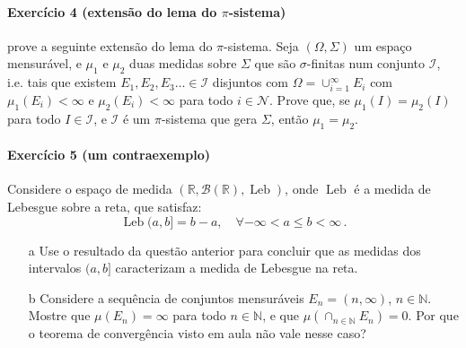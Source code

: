 \documentclass[10pt,a4paper]{article}
\begin{document}
		\paragraph{Exercício 4 (extensão do lema do $\pi$-sistema)} prove a seguinte extensão do lema do $\pi$-sistema. Seja $(\Omega, \Sigma)$ um espaço mensurável, e $\mu_1$ e $\mu_2$ duas medidas sobre $\Sigma$ que são $\sigma$-finitas num conjunto $\mathcal{I}$, i.e. tais que existem $E_1, E_2 , E_3 \ldots \in \mathcal{I}$ disjuntos com  $\Omega = \cup_{i=1}^\infty E_i$ com $\mu_1(E_i)<\infty$ e $\mu_2(E_i)<\infty$ para todo $i \in \mathcal{N}$. Prove que, se $\mu_1(I)  = \mu_2(I)$ para todo $I \in \mathcal{I}$, e $\mathcal{I}$ é um $\pi$-sistema que gera $\Sigma$, então $\mu_1 =  \mu_2$.
		
		\paragraph{Exercício 5 (um contraexemplo)} Considere o espaço de medida $(\mathbb{R}, \mathcal{B}(\mathbb{R}), \operatorname{Leb})$, onde  $\operatorname{Leb}$ é a medida de Lebesgue sobre a reta, que satisfaz:
		$$\operatorname{Leb}(a,b] = b-a, \quad \forall -\infty<a\leq b < \infty\, .$$ 
		\begin{itemize}
			\item[a] Use o resultado da questão anterior para concluir que as medidas dos intervalos $(a,b]$ caracterizam a medida de Lebesgue na reta.
			\item[b] Considere a sequência de conjuntos mensuráveis $E_n = (n, \infty)$, $n \in \mathbb{N}$. Mostre que $\mu(E_n) = \infty$ para todo $n \in \mathbb{N}$, e que $\mu(\cap_{n \in \mathbb{N}} E_n) = 0$. Por que o teorema de convergência visto em aula não vale nesse caso?
		\end{itemize}
		
\end{document}
